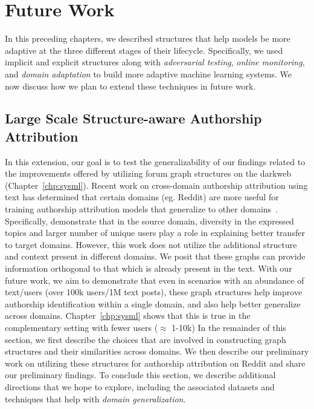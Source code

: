 \chapter{Future Work}
\label{chp:future_work}

In this preceding chapters, we described structures that help models be more adaptive at the three different stages of their lifecycle.
Specifically, we used implicit and explicit structures along with \textit{adversarial testing}, \textit{online monitoring}, and \textit{domain adaptation} to build more adaptive machine learning systems.
We now discuss how we plan to extend these techniques in future work.

\section{Large Scale Structure-aware Authorship Attribution}
\label{sec:future_work:scale}
In this extension, our goal is to test the generalizability of our findings related to the improvements offered by utilizing forum graph structures on the darkweb (Chapter~\ref{chp:sysml}).
Recent work on cross-domain authorship attribution using text has determined that certain domains (eg. Reddit) are more useful for training authorship attribution models that generalize to other domains~\cite{barlas2020cross,riverastao2021learning}.
Specifically, \citet{riverastao2021learning} demonstrate that in the source domain, diversity in the expressed topics and larger number of unique users play a role in explaining better transfer to target domains.
However, this work does not utilize the additional structure and context present in different domains.
We posit that these graphs can provide information orthogonal to that which is already present in the text.
 With our future work, we aim to demonstrate that even in scenarios with an abundance of text/users (over 100k users/1M text posts), these graph structures help improve authorship identification within a single domain, and also help better generalize across domains.
 Chapter~\ref{chp:sysml} shows that this is true in the complementary setting with fewer users ($\approx$ 1-10k)
In the remainder of this section, we first describe the choices that are involved in constructing graph structures and their similarities across domains. 
We then describe our preliminary work on utilizing these structures for authorship attribution on Reddit and share our preliminary findings.
To conclude this section, we describe additional directions that we hope to explore, including the associated datasets and techniques that help with \textit{domain generalization}.

